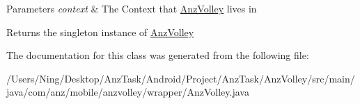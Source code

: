 \begin{DoxyParams}{Parameters}
{\em context} & The Context that \hyperlink{classcom_1_1anz_1_1mobile_1_1anzvolley_1_1wrapper_1_1_anz_volley}{Anz\+Volley} lives in \\
\hline
\end{DoxyParams}
\begin{DoxyReturn}{Returns}
the singleton instance of \hyperlink{classcom_1_1anz_1_1mobile_1_1anzvolley_1_1wrapper_1_1_anz_volley}{Anz\+Volley} 
\end{DoxyReturn}


The documentation for this class was generated from the following file\+:\begin{DoxyCompactItemize}
\item 
/\+Users/\+Ning/\+Desktop/\+Anz\+Task/\+Android/\+Project/\+Anz\+Task/\+Anz\+Volley/src/main/java/com/anz/mobile/anzvolley/wrapper/Anz\+Volley.\+java\end{DoxyCompactItemize}
